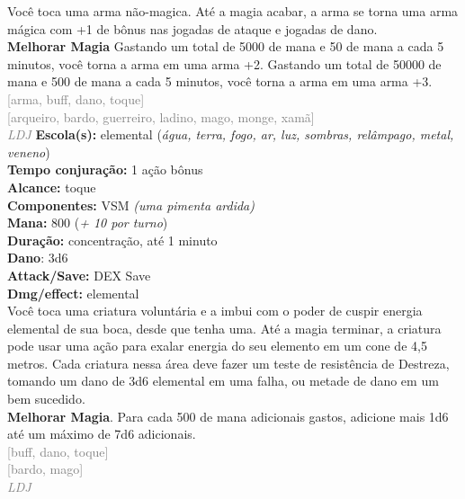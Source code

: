 \documentclass{RPG_Adventure}[2021/10/20]
\begin{document}
{\normalsize Você toca uma arma não-magica. Até a magia acabar, a arma se torna uma arma mágica com +1 de bônus nas jogadas de ataque e jogadas de dano.\\\t \textbf{Melhorar Magia} Gastando um total de 5000 de mana e 50 de mana a cada 5 minutos, você torna a arma em uma arma +2. Gastando um total de 50000 de mana e 500 de mana a cada 5 minutos, você torna a arma em uma arma +3.\\}
{\scriptsize \textcolor{gray}{[arma, buff, dano, toque]\\}}
{\scriptsize \textcolor{gray}{[arqueiro, bardo, guerreiro, ladino, mago, monge, xamã]\\}}
{\tiny \textcolor{gray}{\textit{LDJ}}}\jump{}
{\small \t \textbf{Escola(s):} elemental (\textit{água, terra, fogo, ar, luz, sombras, relâmpago, metal, veneno})\\\t \textbf{Tempo conjuração:} 1 ação bônus\\\t \textbf{Alcance:} toque\\\t \textbf{Componentes:} VSM \textit{(uma pimenta ardida)}\\\t \textbf{Mana:} 800 (\textit{+ 10 por turno})\\\t \textbf{Duração:} concentração, até 1 minuto\\\t \textbf{Dano}: 3d6\\\t \textbf{Attack/Save:} DEX Save\\\t \textbf{Dmg/effect:} elemental\\}
{\normalsize Você toca uma criatura voluntária e a imbui com o poder de cuspir energia elemental de sua boca, desde que tenha uma. Até a magia terminar, a criatura pode usar uma ação para exalar energia do seu elemento em um cone de 4,5 metros. Cada criatura nessa área deve fazer um teste de resistência de Destreza, tomando um dano de 3d6 elemental em uma falha, ou metade de dano em um bem sucedido.\\\t \textbf{Melhorar Magia}. Para cada 500 de mana adicionais gastos, adicione mais 1d6 até um máximo de 7d6 adicionais.\\}
{\scriptsize \textcolor{gray}{[buff, dano, toque]\\}}
{\scriptsize \textcolor{gray}{[bardo, mago]\\}}
{\tiny \textcolor{gray}{\textit{LDJ}}}\jump{}
\end{document}
